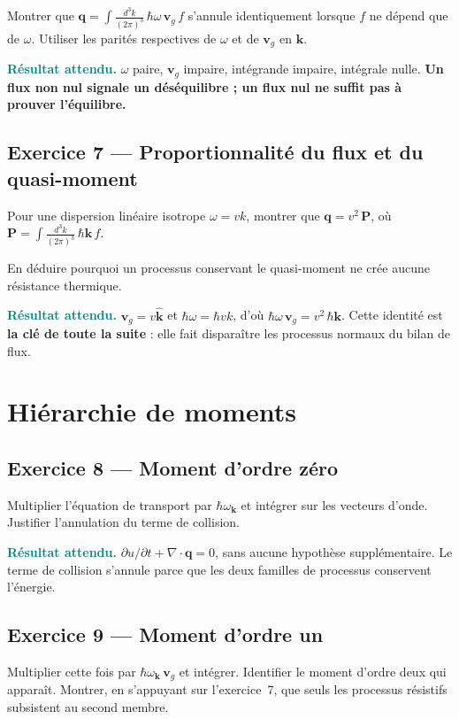 \documentclass[11pt,a4paper]{article}
\newcommand{\rep}[1]{\par\smallskip\noindent\textcolor{teal}{\textbf{Résultat attendu.}}\; #1\par\smallskip}
\begin{document}
Montrer que $\mathbf{q} = \int \frac{d^3k}{(2\pi)^3}\,\hbar\omega\,\mathbf{v}_g\,f$ s'annule
identiquement lorsque $f$ ne dépend que de $\omega$. Utiliser les parités respectives de $\omega$ et
de $\mathbf{v}_g$ en $\mathbf{k}$.

\rep{$\omega$ paire, $\mathbf{v}_g$ impaire, intégrande impaire, intégrale nulle. \textbf{Un flux non nul signale un déséquilibre ; un flux nul ne suffit pas à prouver l'équilibre.}}

\subsection*{Exercice 7 --- Proportionnalité du flux et du quasi-moment}

Pour une dispersion linéaire isotrope $\omega = vk$, montrer que $\mathbf{q} = v^2\,\mathbf{P}$, où
$\mathbf{P} = \int \frac{d^3k}{(2\pi)^3}\,\hbar\mathbf{k}\,f$.

En déduire pourquoi un processus conservant le quasi-moment ne crée aucune résistance thermique.

\rep{$\mathbf{v}_g = v\hat{\mathbf{k}}$ et $\hbar\omega = \hbar v k$, d'où
$\hbar\omega\,\mathbf{v}_g = v^2\,\hbar\mathbf{k}$. Cette identité est \textbf{la clé de toute la
suite} : elle fait disparaître les processus normaux du bilan de flux.}

\section{Hiérarchie de moments}

\subsection*{Exercice 8 --- Moment d'ordre zéro}

Multiplier l'équation de transport par $\hbar\omega_\mathbf{k}$ et intégrer sur les vecteurs d'onde.
Justifier l'annulation du terme de collision.

\rep{$\partial u/\partial t + \nabla\cdot\mathbf{q} = 0$, sans aucune hypothèse supplémentaire. Le
terme de collision s'annule parce que les deux familles de processus conservent l'énergie.}

\subsection*{Exercice 9 --- Moment d'ordre un}

Multiplier cette fois par $\hbar\omega_\mathbf{k}\,\mathbf{v}_g$ et intégrer. Identifier le moment
d'ordre deux qui apparaît. Montrer, en s'appuyant sur l'exercice~7, que seuls les processus
résistifs subsistent au second membre.
\end{document}
